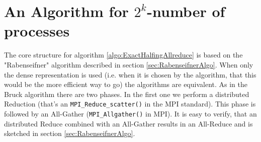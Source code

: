 \section{An Algorithm for $2^k$-number of processes}
The core structure for algorithm \ref{algo:ExactHalfingAllreduce} is based on the  "Rabenseifner" algorithm described in section \ref{sec:RabenseifnerAlgo}. When only the dense representation is used (i.e. when it is chosen by the algorithm, that this would be the more efficient way to go) the algorithms are equivalent. As in the Bruck algorithm there are two phases. In the first one we perform a distributed Reduction (that's an \texttt{MPI\_Reduce\_scatter()} in the MPI standard). This phase is followed by an All-Gather (\texttt{MPI\_Allgather()} in MPI). It is easy to verify, that an distributed Reduce combined with an All-Gather results in an All-Reduce and is sketched in section \ref{sec:RabenseifnerAlgo}. 

